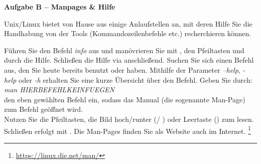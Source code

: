 \documentclass[paper=a4,fontsize=11pt]{scrartcl}%
\numberwithin{equation}{section}
\begin{document}
\begin{center}\Large{\textbf{Aufgabe B -- Manpages \& Hilfe}}\end{center}\vskip0.25in
Unix/Linux bietet von Hause aus einige Anlaufstellen an, mit deren Hilfe Sie die Handhabung von der Tools (Kommandozeilenbefehle etc.) recherchieren können.
\begin{tasks}
	\task Führen Sie den Befehl \emph{info} aus und manövrieren Sie mit \keys{\tab}, den Pfeiltasten und \keys{\return} durch die Hilfe. Schließen die Hilfe via  anschließend.
	\task Suchen Sie sich einen Befehl aus, den Sie heute bereits benutzt oder haben. Mithilfe der Parameter \emph{--help}, \emph{-help} oder \emph{-h} erhalten Sie eine kurze Übersicht über den Befehl.
    \task Geben Sie durch: \\
    		\emph{man HIERBEFEHLKEINFUEGEN}\\
		den eben gewählten Befehl ein, sodass das Manual (die sogenannte Man-Page) zum Befehl geöffnet wird.\\
		 Nutzen Sie die Pfeiltasten, die Bild hoch/runter (/ ) oder Leertaste (\keys{\Space}) zum lesen. Schließen erfolgt mit .
		\task Die Man-Pages finden Sie als Website auch im Internet. \footnote{\url{https://linux.die.net/man/}}
\end{tasks}
\end{document}
